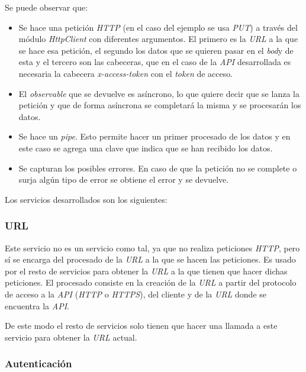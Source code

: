 \bigskip
Se puede observar que:
\begin{itemize}
	\item Se hace una petición \textit{HTTP} (en el caso del ejemplo se usa \textit{PUT}) a través del módulo \textit{HttpClient} con diferentes argumentos. El primero es la \textit{URL} a la que se hace esa petición, el segundo los datos que se quieren pasar en el \textit{bod}y de esta y el tercero son las cabeceras, que en el caso de la \textit{API} desarrollada es necesaria la cabecera \textit{x-access-token} con el \textit{token} de acceso.
	\item El \textit{observable} que se devuelve es asíncrono, lo que quiere decir que se lanza la petición y que de forma asíncrona se completará la misma y se procesarán los datos.
	\item Se hace un \textit{pipe}. Esto permite hacer un primer procesado de los datos y en este caso se agrega una clave que indica que se han recibido los datos.
	\item Se capturan los posibles errores. En caso de que la petición no se complete o surja algún tipo de error se obtiene el error y se devuelve.
\end{itemize}


\bigskip
Los servicios desarrollados son los siguientes:

\subsubsection{URL}

Este servicio no es un servicio como tal, ya que no realiza peticiones \textit{HTTP}, pero sí se encarga del procesado  de la \textit{URL} a la que se hacen las peticiones. Es usado por el resto de servicios para obtener la \textit{URL} a la que tienen que hacer dichas peticiones. El procesado consiste en la creación de la \textit{URL} a partir del protocolo de acceso a la \textit{API} (\textit{HTTP} o \textit{HTTPS}), del cliente y de la \textit{URL} donde se encuentra la \textit{API}.

De este modo el resto de servicios solo tienen que hacer una llamada a este servicio para obtener la \textit{URL} actual.


\subsubsection{Autenticación}

